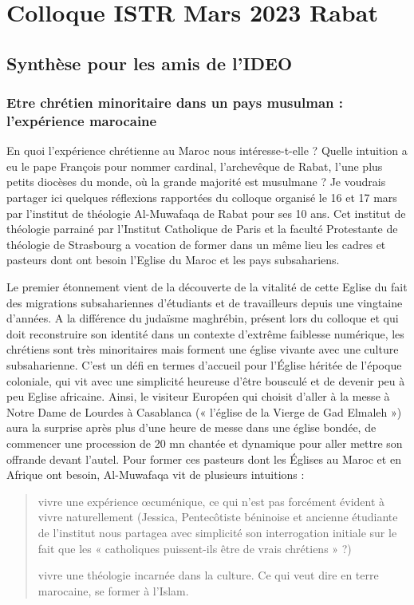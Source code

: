 \chapter{Colloque ISTR Mars 2023 Rabat}


\section{Synthèse pour les amis de l'IDEO}

\subsection{Etre chrétien minoritaire dans un pays musulman : l’expérience marocaine}

En quoi l’expérience chrétienne au Maroc nous intéresse-t-elle ? Quelle intuition a eu le pape François pour nommer cardinal, l’archevêque de Rabat, l’une plus petits diocèses du monde, où la grande majorité est musulmane ?  
Je voudrais partager ici quelques réflexions rapportées du colloque organisé le 16 et 17 mars par l’institut de théologie Al-Muwafaqa de Rabat pour ses 10 ans. Cet institut de théologie parrainé par l’Institut Catholique de Paris et la faculté Protestante de théologie de Strasbourg a vocation de former dans un même lieu les cadres et pasteurs dont ont besoin l’Eglise du Maroc et les pays subsahariens. 

Le premier étonnement vient de la découverte de la vitalité de cette Eglise du fait des migrations subsahariennes d’étudiants et de travailleurs depuis une vingtaine d’années.  A la différence du judaïsme maghrébin, présent lors du colloque et qui doit reconstruire son identité dans un contexte d’extrême faiblesse numérique, les chrétiens sont très minoritaires mais forment une église vivante avec une culture subsaharienne. C’est un défi en termes d’accueil pour l’Église héritée de l’époque coloniale, qui vit avec une simplicité heureuse d’être bousculé et de devenir peu à peu Eglise africaine. Ainsi, le visiteur Européen qui choisit d’aller à la messe à Notre Dame de Lourdes à Casablanca (« l’église de la Vierge de Gad Elmaleh ») aura la surprise après plus d’une heure de messe dans une église bondée, de commencer une procession de 20 mn chantée et dynamique pour aller mettre son offrande devant l’autel.  
Pour former ces pasteurs dont les Églises au Maroc et en Afrique ont besoin, Al-Muwafaqa vit de plusieurs intuitions : 
\begin{quote}
  \item	vivre une expérience œcuménique, ce qui n’est pas forcément évident à vivre naturellement (Jessica, Pentecôtiste béninoise et ancienne étudiante de l’institut nous partagea avec simplicité son interrogation initiale  sur le fait que les « catholiques puissent-ils être de vrais chrétiens » ?) 
  \item		vivre une théologie incarnée dans la culture. Ce qui veut dire en terre marocaine, se former à l’Islam.
\end{quote}


